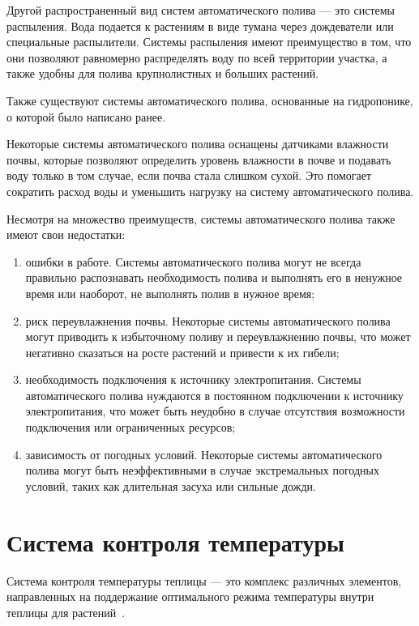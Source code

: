 Другой распространенный вид систем автоматического полива --- это системы распыления. Вода подается к растениям в виде тумана через дождеватели или специальные распылители. Системы распыления имеют преимущество в том, что они позволяют равномерно распределять воду по всей территории участка, а также удобны для полива крупнолистных и больших растений.

Также существуют системы автоматического полива, основанные на гидропонике, о которой было написано ранее.

Некоторые системы автоматического полива оснащены датчиками влажности почвы, которые позволяют определить уровень влажности в почве и подавать воду только в том случае, если почва стала слишком сухой. Это помогает сократить расход воды и уменьшить нагрузку на систему автоматического полива.

Несмотря на множество преимуществ, системы автоматического полива также имеют свои недостатки:

\begin{enumerate}
    \item ошибки в работе. Системы автоматического полива могут не всегда правильно распознавать необходимость полива и выполнять его в ненужное время или наоборот, не выполнять полив в нужное время;
    \item риск переувлажнения почвы. Некоторые системы автоматического полива могут приводить к избыточному поливу и переувлажнению почвы, что может негативно сказаться на росте растений и привести к их гибели;
    \item необходимость подключения к источнику электропитания. Системы автоматического полива нуждаются в постоянном подключении к источнику электропитания, что может быть неудобно в случае отсутствия возможности подключения или ограниченных ресурсов;
    \item зависимость от погодных условий. Некоторые системы автоматического полива могут быть неэффективными в случае экстремальных погодных условий, таких как длительная засуха или сильные дожди.
\end{enumerate}

\section{Система контроля  температуры}

Система контроля температуры теплицы --- это комплекс различных элементов, направленных на поддержание оптимального режима температуры внутри теплицы для растений~\cite{Temperature}.

